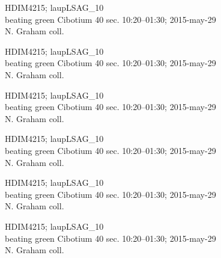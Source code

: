 \documentclass[2pt]{extarticle}
\begin{document}
\noindent
\parbox{0.16\textwidth}{\tiny \raggedright \rule[-0.3\baselineskip]{0pt}{10pt}HDIM4215; laupLSAG\_10\\ beating green Cibotium 40 sec. 10:20--01:30; 2015-may-29\\ N. Graham coll.}
\parbox{0.16\textwidth}{\tiny \raggedright \rule[-0.3\baselineskip]{0pt}{10pt}HDIM4215; laupLSAG\_10\\ beating green Cibotium 40 sec. 10:20--01:30; 2015-may-29\\ N. Graham coll.}
\parbox{0.16\textwidth}{\tiny \raggedright \rule[-0.3\baselineskip]{0pt}{10pt}HDIM4215; laupLSAG\_10\\ beating green Cibotium 40 sec. 10:20--01:30; 2015-may-29\\ N. Graham coll.}
\parbox{0.16\textwidth}{\tiny \raggedright \rule[-0.3\baselineskip]{0pt}{10pt}HDIM4215; laupLSAG\_10\\ beating green Cibotium 40 sec. 10:20--01:30; 2015-may-29\\ N. Graham coll.}
\parbox{0.16\textwidth}{\tiny \raggedright \rule[-0.3\baselineskip]{0pt}{10pt}HDIM4215; laupLSAG\_10\\ beating green Cibotium 40 sec. 10:20--01:30; 2015-may-29\\ N. Graham coll.}
\parbox{0.16\textwidth}{\tiny \raggedright \rule[-0.3\baselineskip]{0pt}{10pt}HDIM4215; laupLSAG\_10\\ beating green Cibotium 40 sec. 10:20--01:30; 2015-may-29\\ N. Graham coll.} \\ 
\vspace{0.001in} 
\end{document}

